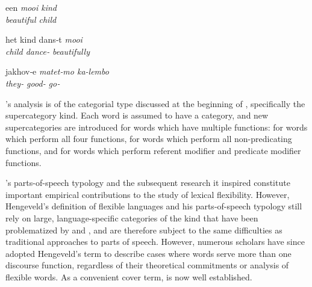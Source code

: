 \begin{exe}

  \ex\label{ex:2.3}
  \begin{xlist}

    \ex\label{ex:2.3a}
    \gll een        \em{mooi}      kind\\
          \em{beautiful} child\\

    \ex\label{ex:2.3b}
    \gll het      kind  dans‑t              \em{mooi}\\
          child dance‑ \em{beautifully}\\

  \end{xlist}

  \ex\label{ex:2.4}
  \vfix
  \gll jakhov‑e       \em{matet‑mo}         ka-lembo\\
       they‑ \em{good‑} go‑\\
  \vfix
  \hfill\hspace*{1em}\mbox{\footnotesize{}\normalsize}

\end{exe}

\citeauthor{Hengeveld1992}'s analysis is of the categorial type discussed at the beginning of , specifically the supercategory kind. Each word is assumed to have a category, and new supercategories are introduced for words which have multiple functions:  for words which perform all four functions,  for words which perform all non-predicating functions, and  for words which perform referent modifier and predicate modifier functions.

\citeauthor{Hengeveld1992}'s parts-of-speech typology and the subsequent research it inspired \parencites{DonLier2013}{HengeveldRijkhoff2005}{Lier2006}{HengeveldLier2012}{Luuk2010}{LierRijkhoff2013}{Lier2016} constitute important empirical contributions to the study of lexical flexibility. However, Hengeveld's definition of flexible languages and his parts-of-speech typology still rely on large, language-specific categories of the kind that have been problematized by \textcite[§2.2.2]{Croft2001b} and \textcite{CroftLier2012}, and are therefore subject to the same difficulties as traditional approaches to parts of speech. However, numerous scholars have since adopted Hengeveld's term  to describe cases where words serve more than one discourse function, regardless of their theoretical commitments or analysis of flexible words. As a convenient cover term,  is now well established.

